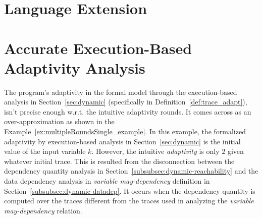 \section{Language Extension}
\label{subsec:refine-exe-language}


\section{Accurate Execution-Based Adaptivity Analysis}
\label{sec:refine-exe}
%
% 
The program's adaptivity in the formal model through the execution-based analysis in Section~\ref{sec:dynamic}
(specifically in Definition~\ref{def:trace_adapt}), isn't precise enough w.r.t. the intuitive adaptivity rounds.
It comes across as an over-approximation 
as shown in the Example~\ref{ex:multipleRoundsSingle_example}.
In this example, the formalized adaptivity by execution-based analysis in Section~\ref{sec:dynamic} 
is the initial value of the input variable $k$.
However, the intuitive \emph{adaptivity} is only $2$ given whatever initial trace.
This is resulted from the
disconnection between the 
dependency quantity analysis in Section~\ref{subsubsec:dynamic-reachability} and 
the data dependency analysis in \emph{variable may-dependency} definition in Section~\ref{subsubsec:dynamic-datadep}.
It occurs when the 
dependency quantity is computed over the traces different from the traces used in 
analyzing the \emph{variable may-dependency} relation.


